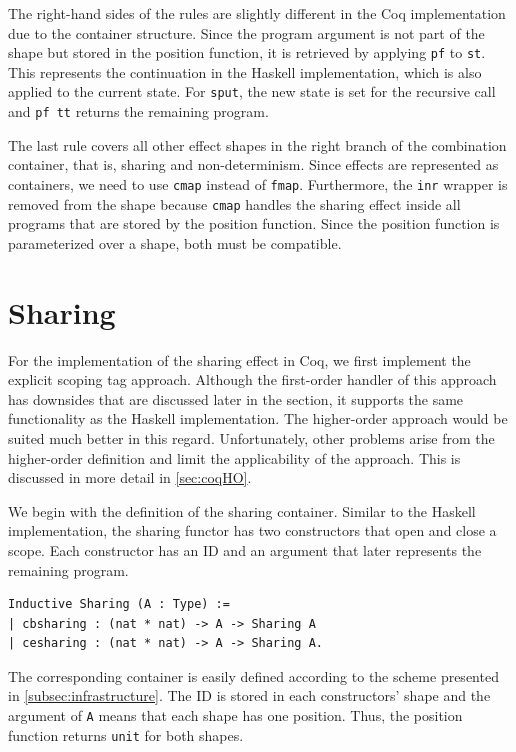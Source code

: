 \documentclass[a4paper, 11pt, fleqn, twoside, abstract=on]{scrreprt}
\newcommand{\cinl}[1]{\texttt{#1}}
\begin{document}
The right-hand sides of the rules are slightly different in the Coq implementation due to the container structure.
Since the program argument is not part of the shape but stored in the position function, it is retrieved by applying \cinl{pf} to \cinl{st}.
This represents the continuation in the Haskell implementation, which is also applied to the current state.
For \cinl{sput}, the new state is set for the recursive call and \cinl{pf tt} returns the remaining program.

The last rule covers all other effect shapes in the right branch of the combination container, that is, sharing and non-determinism.
Since effects are represented as containers, we need to use \cinl{cmap} instead of \cinl{fmap}.
Furthermore, the \cinl{inr} wrapper is removed from the shape because \cinl{cmap} handles the sharing effect inside all programs that are stored by the position function.
Since the position function is parameterized over a shape, both must be compatible.

\section{Sharing}
\label{sec:lawsOfSharing}
For the implementation of the sharing effect in Coq, we first implement the explicit scoping tag approach.
Although the first-order handler of this approach has downsides that are discussed later in the section, it supports the same functionality as the Haskell implementation.
The higher-order approach would be suited much better in this regard.
Unfortunately, other problems arise from the higher-order definition and limit the applicability of the approach.
This is discussed in more detail in \autoref{sec:coqHO}.

We begin with the definition of the sharing container.
Similar to the Haskell implementation, the sharing functor has two constructors that open and close a scope.
Each constructor has an ID and an argument that later represents the remaining program.

\begin{verbatim}
Inductive Sharing (A : Type) :=
| cbsharing : (nat * nat) -> A -> Sharing A
| cesharing : (nat * nat) -> A -> Sharing A.
\end{verbatim}

The corresponding container is easily defined according to the scheme presented in \autoref{subsec:infrastructure}.
The ID is stored in each constructors' shape and the argument of \cinl{A} means that each shape has one position.
Thus, the position function returns \cinl{unit} for both shapes.
\end{document}
